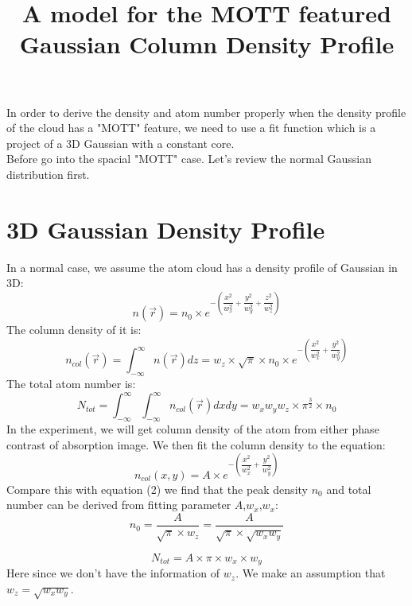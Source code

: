 \documentclass[a4paper]{article}
\title{A model for the MOTT featured Gaussian Column Density Profile}
\begin{document}
\begin{spacing}{1.25}
\maketitle

In order to derive the density and atom number properly when the density profile of the cloud has a "MOTT" feature, 
we need to use a fit function which is a project of a 3D Gaussian with a constant core.\\ 
Before go into the spacial "MOTT" case. Let's review the normal Gaussian distribution first.
\section{3D Gaussian Density Profile}
In a normal case, we assume the atom cloud has a density profile of Gaussian in 3D:
\begin{equation}
n(\vec{r}) = n_{0} \times e^{-(\dfrac{x^{2}}{w_{x}^{2}}+\dfrac{y^{2}}{w_{y}^{2}}+\dfrac{z^{2}}{w_{z}^{2}})}
\end{equation}
The column density of it is:
\begin{equation}
n_{col}(\vec{r}) = \int_{-\infty}^\infty n(\vec{r}) dz= w_{z}\times\sqrt{\pi}\times n_{0}\times e^{-(\dfrac{x^{2}}{w_{x}^{2}}+\dfrac{y^{2}}{w_{y}^{2}})}
\end{equation}
The total atom number is:
\begin{equation}
N_{tot} = \int_{-\infty}^\infty\int_{-\infty}^\infty n_{col}(\vec{r}) dxdy = w_{x}w_{y}w_{z}\times \pi^{\frac{3}{2}} \times n_{0}
\end{equation}
In the experiment, we will get column density of the atom from either phase contrast of absorption image.
We then fit the column density to the equation:
\begin{equation}
n_{col}(x,y) = A \times e^{-(\dfrac{x^{2}}{w_{x}^{2}}+\dfrac{y^{2}}{w_{y}^{2}})}
\end{equation}
Compare this with equation (2) we find that the peak density $n_{0}$ and total number can be derived from fitting parameter $A$,$w_{x}$,$w_{x}$:
\begin{equation}
n_{0} = \frac{A}{\sqrt{\pi}\times w_{z}} = \frac{A}{\sqrt{\pi}\times \sqrt{w_{x}w_{y}}}
\end{equation}

\begin{equation}
N_{tot} = A \times\pi\times  w_{x}\times w_{y}  
\end{equation}
Here since we don't have the information of $w_{z}$. We make an assumption that $w_{z}=\sqrt{w_{x}w_{y}}$.


\end{spacing}
\end{document}
